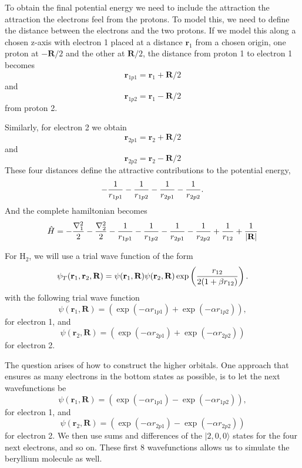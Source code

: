 \documentclass[aps,prc,twocolumn,floatfix]{revtex4}
\def\rvec{\textbf{r}}
\def\Rvec{\textbf{R}}
\begin{document}
To obtain the final potential energy we need to include the attraction the attraction the electrons feel from the protons. To model this, we need to define the distance between the electrons and the two protons. If we model this along a chosen z-axis with electron 1 placed at a distance $\rvec_1$ from a chosen origin, one proton at $-\Rvec/2$ and the other at $\Rvec/2$, the distance from proton 1 to electron 1 becomes
\begin{equation}
 \rvec_{1p1} = \rvec_1 + \Rvec/2
\end{equation}
and 
\begin{equation}
\rvec_{1p2} = \rvec_1 - \Rvec/2
\end{equation}
from proton 2. 

Similarly, for electron 2 we obtain
\begin{equation}
 \rvec_{2p1} = \rvec_2 + \Rvec/2
\end{equation}
and 
\begin{equation}
 \rvec_{2p2} = \rvec_2 - \Rvec/2
\end{equation}
These four distances define the attractive contributions to the potential energy, 
$$
-{1\over r_{1p1}} - {1 \over r_{1p2}} - {1\over r_{2p1}} - {1 \over r_{2p2}}.
$$
And the complete hamiltonian becomes 
\begin{equation}
 \hat{H} =  -{\nabla^2_1 \over 2} - {\nabla^2_2 \over 2} -{1\over r_{1p1}} - {1 \over r_{1p2}} - {1\over r_{2p1}} - {1 \over r_{2p2}} + {1\over r_{12}} + {1\over |\Rvec|}
\end{equation}


For $\text{H}_2$, we will use a trial wave function of the form 
\begin{equation}
 \psi_T(\rvec_1, \rvec_2, \Rvec) = \psi(\rvec_1, \Rvec)\psi(\rvec_2,\Rvec)\exp\left( {r_{12} \over 2(1+\beta r_{12})} \right).
\end{equation}
with the following trial wave function 
\begin{equation}
 \psi(\rvec_1, \Rvec) = (\exp(-\alpha r_{1p1})  + \exp(-\alpha r_{1p2})),
\end{equation}
for electron 1, and 
\begin{equation}
 \psi(\rvec_2, \Rvec) = (\exp(-\alpha r_{2p1}) + \exp(-\alpha r_{2p2}))
\end{equation}
for electron 2. 

The question arises of how to construct the higher orbitals. One approach that ensures as many electrons in the bottom states as possible, is to let the next wavefunctions be 
\begin{equation}
 \psi(\rvec_1, \Rvec) = (\exp(-\alpha r_{1p1})  - \exp(-\alpha r_{1p2})),
\end{equation}
for electron 1, and 
\begin{equation}
 \psi(\rvec_2, \Rvec) = (\exp(-\alpha r_{2p1}) - \exp(-\alpha r_{2p2}))
\end{equation}
for electron 2. We then use sums and differences of the $|2,0,0 \rangle$ states for the four next electrons, and so on. These first 8 wavefunctions allows us to simulate the beryllium molecule as well. 
\end{document}
